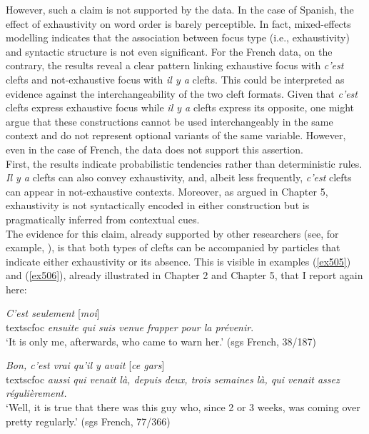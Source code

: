 However, such a claim is not supported by the data. In the case of Spanish, the effect of exhaustivity on word order is barely perceptible. 
In fact, mixed-effects modelling indicates that the association between focus type (i.e., exhaustivity) and syntactic structure is not even significant. For the French data, on the contrary, the results reveal a clear pattern linking exhaustive focus with \textit{c'est} clefts and not-exhaustive focus with \textit{il y a} clefts. This could be interpreted as evidence against the interchangeability of the two cleft formats. Given that \textit{c'est} clefts express exhaustive focus while \textit{il y a} clefts express its opposite, one might argue that these constructions cannot be used interchangeably in the same context and do not represent optional variants of the same variable. However, even in the case of French, the data does not support this assertion.\\
First, the results indicate probabilistic tendencies rather than deterministic rules. \textit{Il y a} clefts can also convey exhaustivity, and, albeit less frequently, \textit{c'est} clefts can appear in not-exhaustive contexts. Moreover, as argued in Chapter 5, exhaustivity is not syntactically encoded in either construction but is pragmatically inferred from contextual cues. \\
The evidence for this claim, already supported by other researchers (see, for example, \cite{horn1981exhaustiveness, dufter2009clefting, destruel2018interpretation}), is that both types of clefts can be accompanied by particles that indicate either exhaustivity or its absence. This is visible in examples (\ref{ex505}) and (\ref{ex506}), already illustrated in Chapter 2 and Chapter 5, that I report again here:

\ea \label{ex505} 
 \textit{C'est seulement} {[\textit{moi}]\\textsc{foc}} \normalsize \textit{ensuite qui suis venue frapper pour la prévenir}.\\  
`It is only me, afterwards, who came to warn her.' \hfill (sgs French, 38/187)   
\z

\ea \label{ex506}
\textit{Bon, c'est vrai qu'il y avait} {[\textit{ce gars}]\\textsc{foc}} \normalsize \textit{aussi qui venait là, depuis deux, trois semaines là, qui venait assez régulièrement.}\\
`Well, it is true that there was this guy who, since 2 or 3 weeks, was coming over pretty regularly.' \hfill (sgs French, 77/366)  
\z

